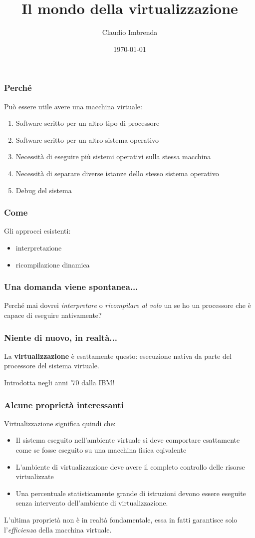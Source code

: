 \documentclass[ignorenonframetext]{beamer}
\title{Il mondo della virtualizzazione}
\date{\today}
\author{Claudio Imbrenda}
\institute{Linux Day 2008 PISA}
\begin{document}
  \begin{frame}
  \titlepage
  \end{frame}
  
  \begin{frame}
  \frametitle{Perché}
  Può essere utile avere una macchina virtuale:
  \begin{enumerate}
  \item Software scritto per un altro tipo di processore
  \item Software scritto per un altro sistema operativo
  \item Necessità di eseguire più sistemi operativi sulla stessa macchina
  \item Necessità di separare diverse istanze dello stesso sistema operativo
  \item Debug del sistema
  \end{enumerate}
  \end{frame}
  
  \begin{frame}
  \frametitle{Come}
  Gli approcci esistenti:
  \begin{itemize}
  \item interpretazione
  \item ricompilazione dinamica
  \end{itemize}
  \end{frame}
  
  \begin{frame}
  \frametitle{Una domanda viene spontanea...}
  Perché mai dovrei \textit{interpretare} o \textit{ricompilare al volo} un
  se ho un processore che è capace di eseguire nativamente?
  \end{frame}
  
  \begin{frame}
  \frametitle{Niente di nuovo, in realtà...}
  
  La \textbf{virtualizzazione} è esattamente questo: esecuzione nativa da parte del
  processore del sistema virtuale. 
  
  Introdotta negli anni '70 dalla IBM!  
  \end{frame}
  
  \begin{frame}
  \frametitle{Alcune proprietà interessanti}
  Virtualizzazione significa quindi che:
  
  \begin{itemize}
  \item Il sistema eseguito nell'ambiente virtuale si deve comportare
  esattamente come se fosse eseguito su una macchina fisica eqivalente
  \item L'ambiente di virtualizzazione deve avere il completo controllo delle risorse
  virtualizzate
  \item Una percentuale statisticamente grande di istruzioni devono essere
  eseguite senza intervento dell'ambiente di virtualizzazione.
  \end{itemize}
  
  L'ultima proprietà non è in realtà fondamentale, essa in fatti garantisce
  solo l'\textit{efficienza} della macchina virtuale.
  
  \end{frame}
  
\end{document}
